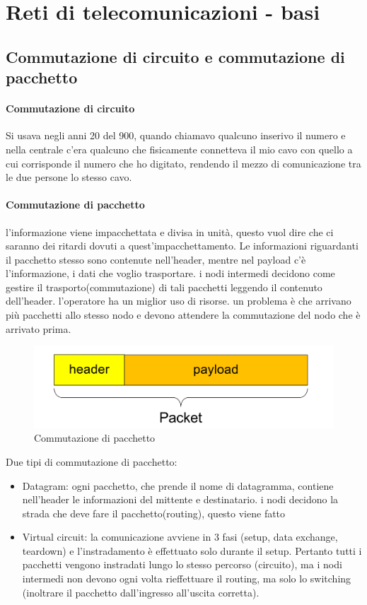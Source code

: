 \section{Reti di telecomunicazioni - basi}
\subsection{Commutazione di circuito e commutazione di pacchetto}
\paragraph{Commutazione di circuito}
Si usava negli anni 20 del 900, quando chiamavo qualcuno inserivo il numero e nella centrale c’era qualcuno che fisicamente connetteva il mio cavo con quello a cui corrisponde il numero che ho digitato, rendendo il mezzo di comunicazione tra le due persone lo stesso cavo.
\paragraph{Commutazione di pacchetto} 
l'informazione viene impacchettata e divisa in unità, questo vuol dire che ci saranno dei ritardi dovuti a quest'impacchettamento. Le informazioni riguardanti il pacchetto stesso sono contenute nell'header, mentre nel payload c'è l'informazione, i dati che voglio trasportare. 
i nodi intermedi decidono come gestire il trasporto(commutazione) di tali pacchetti leggendo il contenuto dell’header. l’operatore ha un miglior uso di risorse.
un problema è che arrivano più pacchetti allo stesso nodo e devono attendere la commutazione del nodo che è arrivato prima.

\begin{figure}[h!]
    \centering
    \includegraphics[width=1.05\textwidth]{images/pacchetto_generico.png}
    \caption{Commutazione di pacchetto}
    \label{fig:commutazione_pacchetto}
\end{figure}

Due tipi di commutazione di pacchetto: 
\begin{itemize}
    \item Datagram: ogni pacchetto, che prende il nome di datagramma, contiene nell’header le informazioni del mittente e destinatario. i nodi decidono la strada che deve fare il pacchetto(routing), questo viene fatto
    \item Virtual circuit: la comunicazione avviene in 3 fasi (setup, data
exchange, teardown) e l'instradamento è effettuato solo durante il setup.
Pertanto tutti i pacchetti vengono instradati lungo lo stesso percorso
(circuito), ma i nodi intermedi non devono ogni volta rieffettuare il routing,
ma solo lo switching (inoltrare il pacchetto dall'ingresso all'uscita corretta).
\end{itemize}
\newpage
